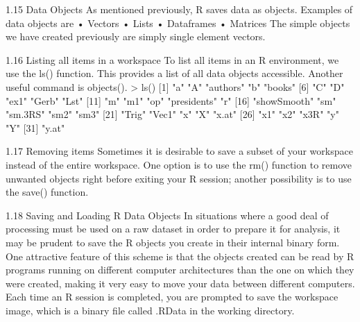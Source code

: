 \documentclass{beamer}
\begin{document}
\begin{frame}

1.15 Data Objects
As mentioned previously, R saves data as objects. Examples of data objects are
• Vectors
• Lists
• Dataframes
• Matrices
The simple objects we have created previously are simply single element vectors.
\end{frame}
\begin{frame}

1.16 Listing all items in a workspace
To list all items in an R environment, we use the ls() function. This provides a list of all data
objects accessible. Another useful command is objects().
> ls()
[1] "a" "A" "authors" "b" "books"
[6] "C" "D" "ex1" "Gerb" "Lst"
[11] "m" "m1" "op" "presidents" "r"
[16] "showSmooth" "sm" "sm.3RS" "sm2" "sm3"
[21] "Trig" "Vec1" "x" "X" "x.at"
[26] "x1" "x2" "x3R" "y" "Y"
[31] "y.at"
\end{frame}
\begin{frame}

1.17 Removing items
Sometimes it is desirable to save a subset of your workspace instead of the entire workspace.
One option is to use the rm() function to remove unwanted objects right before exiting your R
session; another possibility is to use the save() function.

\end{frame}
\begin{frame}
1.18 Saving and Loading R Data Objects
In situations where a good deal of processing must be used on a raw dataset in order to prepare
it for analysis, it may be prudent to save the R objects you create in their internal binary form.
One attractive feature of this scheme is that the objects created can be read by R programs
running on different computer architectures than the one on which they were created, making it
very easy to move your data between different computers. Each time an R session is completed,
you are prompted to save the workspace image, which is a binary file called .RData in the
working directory.
\end{frame}
\end{document}
